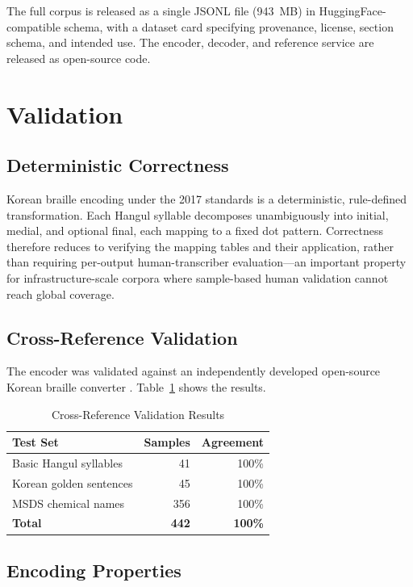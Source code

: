 \documentclass[journal]{IEEEtran}
\begin{document}
The full corpus is released as a single JSONL file (943~MB) in HuggingFace-compatible schema, with a dataset card specifying provenance, license, section schema, and intended use. The encoder, decoder, and reference service are released as open-source code.

\section{Validation}
\label{sec:validation}

\subsection{Deterministic Correctness}

Korean braille encoding under the 2017 standards is a deterministic, rule-defined transformation. Each Hangul syllable decomposes unambiguously into initial, medial, and optional final, each mapping to a fixed dot pattern. Correctness therefore reduces to verifying the mapping tables and their application, rather than requiring per-output human-transcriber evaluation---an important property for infrastructure-scale corpora where sample-based human validation cannot reach global coverage.

\subsection{Cross-Reference Validation}

The encoder was validated against an independently developed open-source Korean braille converter \cite{hangul_braille_converter}. Table~\ref{tab:validation} shows the results.

\begin{table}[h]
\centering
\caption{Cross-Reference Validation Results}
\label{tab:validation}
\begin{tabular}{lrr}
\toprule
Test Set & Samples & Agreement \\
\midrule
Basic Hangul syllables & 41 & 100\% \\
Korean golden sentences & 45 & 100\% \\
MSDS chemical names & 356 & 100\% \\
\midrule
\textbf{Total} & \textbf{442} & \textbf{100\%} \\
\bottomrule
\end{tabular}
\end{table}

\subsection{Encoding Properties}
\end{document}
